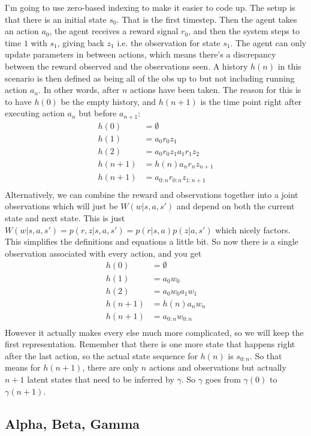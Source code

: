 \documentclass[10pt,english]{article}
\begin{document}
I'm going to use zero-based indexing to make it easier to code up. The setup is that there is an initial state $s_0$. That is the first timestep. Then the agent takes an action $a_0$, the agent receives a reward signal $r_0$, and then the system steps to time $1$ with $s_1$, giving back $z_1$ i.e. the observation for state $s_1$. The agent can only update parameters in between actions, which means there's a discrepancy between the reward observed and the observations seen. A history $h(n)$ in this scenario is then defined as being all of the obs up to but not including running action $a_n$. In other words, after $n$ actions have been taken. The reason for this is to have $h(0)$ be the empty history, and $h(n+1)$ is the time point right after executing action $a_n$ but before $a_{n+1}$:
\begin{align}
h(0) &= \emptyset \\
h(1) &= a_0 r_0 z_1 \\
h(2) &= a_0 r_0 z_1 a_1 r_1 z_2 \\
h(n+1) &= h(n) a_{n} r_{n} z_{n+1} \\
h(n+1) &= a_{0:n} r_{0:n} z_{1:n+1} \\
\end{align}
Alternatively, we can combine the reward and observations together into a joint observations which will just be $W(w|s,a,s')$ and depend on both the current state and next state. This is just $W(w|s,a,s') = p(r,z|s,a,s') = p(r | s,a)p(z|a,s')$ which nicely factors. This simplifies the definitions and equations a little bit. So now there is a single observation associated with every action, and you get
\begin{align}
h(0) &= \emptyset \\
h(1) &= a_0 w_0 \\
h(2) &= a_0 w_0 a_1 w_1 \\
h(n+1) &= h(n) a_{n} w_n \\
h(n+1) &= a_{0:n} w_{0:n} \\
\end{align}
However it actually makes every else much more complicated, so we will keep the first representation. Remember that there is one more state that happens right after the last action, so the actual state sequence for $h(n)$ is $s_{0:n}$. So that means for $h(n+1)$, there are only $n$ actions and observations but actually $n+1$ latent states that need to be inferred by $\gamma$. So $\gamma$ goes from $\gamma(0)$ to $\gamma(n+1)$.

\subsection{Alpha, Beta, Gamma}
\end{document}
